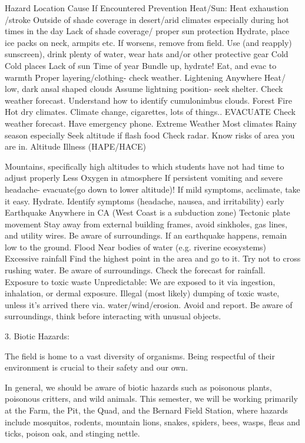 \documentclass[12pt]{../SOP2}
\begin{document}
Hazard
Location
Cause
If Encountered
Prevention
Heat/Sun:
Heat exhaustion
/stroke
Outside of shade coverage in desert/arid climates especially during hot times in the day
Lack of shade 
coverage/ proper sun protection
Hydrate, place ice packs on neck, armpits etc. If worsens, remove from field.
Use (and reapply) sunscreen), drink plenty of water, wear hats and/or other protective gear
Cold
Cold places
Lack of sun
Time of year
Bundle up, hydrate! Eat, and evac to warmth
Proper layering/clothing- check weather.
Lightening
Anywhere
Heat/ low, dark ansal shaped clouds
Assume lightning position- seek shelter.
Check weather forecast. Understand how to identify cumulonimbus clouds.
Forest Fire
Hot dry climates.
Climate change, cigarettes, lots of things..
EVACUATE
Check weather forecast. Have emergency phone.
Extreme Weather
Most climates
Rainy season especially
Seek altitude if flash food
Check radar. Know risks of area you are in.
Altitude Illness (HAPE/HACE)



Mountains, specifically high altitudes to which students have not had time to adjust properly
Less Oxygen in atmosphere
If persistent vomiting and severe headache- evacuate(go down to lower altitude)! If mild symptoms, acclimate, take it easy. Hydrate.
Identify symptoms (headache, nausea, and irritability) early
Earthquake
Anywhere in CA (West Coast is a subduction zone)
Tectonic plate movement
Stay away from external building frames, avoid sinkholes, gas lines, and utility wires.
Be aware of surroundings. If an earthquake happens, remain low to the ground.
Flood
Near bodies of water (e.g. riverine ecosystems)
Excessive rainfall
Find the highest point in the area and go to it. Try not to cross rushing water.
Be aware of surroundings. Check the forecast for rainfall.
Exposure to toxic waste
Unpredictable: We are exposed to it via ingestion, inhalation, or dermal exposure.
Illegal (most likely) dumping of toxic waste, unless it’s arrived there via. water/wind/erosion.
Avoid and report.
Be aware of surroundings, think before interacting with unusual objects.

3. Biotic Hazards:

The field is home to a vast diversity of organisms. Being respectful of their environment is crucial to their safety and our own.

In general, we should be aware of biotic hazards such as poisonous plants, poisonous critters, and wild animals. This semester, we will be working primarily at the Farm, the Pit, the Quad, and the Bernard Field Station, where hazards include mosquitos, rodents, mountain lions, snakes, spiders, bees, wasps, fleas and ticks, poison oak, and stinging nettle.
\end{document}
